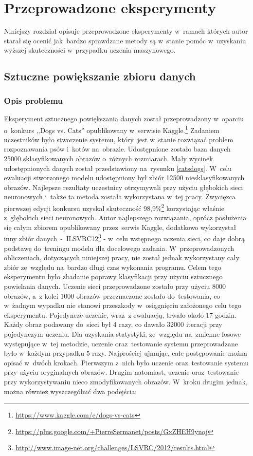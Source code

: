 \section{Przeprowadzone eksperymenty} \label{results}
Niniejszy rozdział opisuje przeprowadzone eksperymenty w~ramach których autor starał się ocenić jak~bardzo sprawdzane metody są w~stanie pomóc w~uzyskaniu wyższej skuteczności w~przypadku uczenia maszynowego. 

\subsection{Sztuczne powiększanie zbioru danych}
\subsubsection{Opis problemu}
Eksperyment sztucznego powiększania danych został przeprowadzony w~oparciu o~konkurs ,,Dogs vs. Cats'' opublikowany w~serwisie Kaggle.\footnote{\label{myfootnote1}\url{https://www.kaggle.com/c/dogs-vs-cats}} Zadaniem uczestników było stworzenie systemu, który~jest w~stanie rozwiązać problem rozpoznawania psów i~kotów na~obrazie. Udostępnione zostało baza danych 25000 sklasyfikowanych obrazów o~różnych rozmiarach. Mały wycinek udostępnionych danych został przedstawiony na~rysunku \ref{catsdogs}. W~celu ewaluacji stworzonego modelu udostępniony był zbiór 12500 niesklasyfikowanych obrazów. Najlepsze rezultaty uczestnicy otrzymywali przy użyciu głębokich sieci neuronowych i~także ta metoda została wykorzystana w~tej pracy. Zwycięzca pierwszej edycji konkursu uzyskal skuteczność 98,9\%\footnote{\label{myfootnote2}\url{https://plus.google.com/+PierreSermanet/posts/GxZHEH9ynoj}} korzystając właśnie z~głębokich sieci neuronowych. Autor najlepszego rozwiązania, oprócz posłużenia się całym zbiorem opublikowany przez~serwis Kaggle, dodatkowo wykorzystał inny zbiór danych~-~ILSVRC12\footnote{\url{http://www.image-net.org/challenges/LSVRC/2012/results.html}} - w~celu wstępnego uczenia sieci, co daje dobrą podstawę do~treningu modelu dla docelowego zadania. W~przeprowadzonych obliczeniach, dotyczących niniejszej pracy, nie został jednak wykorzystany cały zbiór ze~względu na~bardzo długi czas wykonania programu. Celem tego eksperymentu było zbadanie poprawy klasyfikacji przy użyciu sztucznego powielania danych. Uczenie sieci przeprowadzone zostało przy użyciu 8000 obrazów, a~z kolei 1000 obrazów przeznaczone zostało do~testowania, co w~żadnym wypadku nie stanowi przeszkody w~osiągnięciu założonego celu tego eksperymentu. Pojedyncze uczenie, wraz~z ewaluacją, trwało około 17 godzin. Każdy obraz podawany do~sieci był 4 razy, co dawało 32000 iteracji przy pojedynczym uczeniu. Dla uzyskania statystyki, ze~względu na~zmienne losowe występujące w~tej metodzie, uczenie oraz~testowanie systemu przeprowadzane było w~każdym przypadku 5 razy. Najprościej ujmując, całe postępowanie można opisać w~dwóch krokach. Pierwszym z~nich było uczenie oraz~testowanie systemu przy użyciu oryginalnych obrazów. Drugim natomiast, uczenie oraz~testowanie przy wykorzystywaniu nieco zmodyfikowanych obrazów. W~kroku drugim jednak, można również wyszczególnić dwa podejścia:
